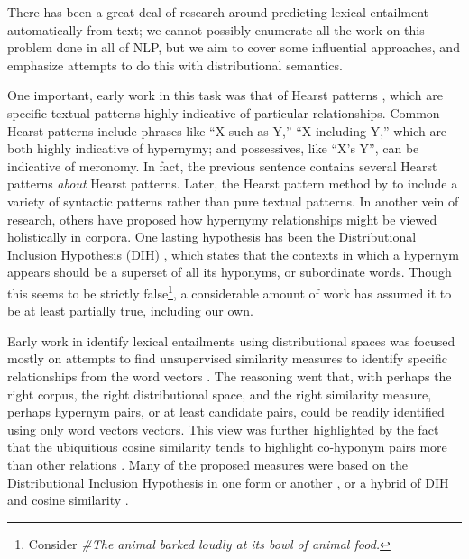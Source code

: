 \documentclass[letterpaper]{article}
\begin{document}
There has been a great deal of research around predicting lexical entailment
automatically from text; we cannot possibly enumerate all the work on this
problem done in all of NLP, but we aim to cover some influential approaches,
and emphasize attempts to do this with distributional semantics.

One important, early work in this task was that of Hearst patterns
\cite{hearst:1992:coling}, which are specific textual patterns highly
indicative of particular relationships. Common Hearst patterns include
phrases like ``X such as Y,'' ``X including Y,'' which are both highly
indicative of hypernymy; and possessives, like ``X's Y'', can be indicative
of meronomy. In fact, the previous sentence contains several Hearst patterns
{\em about} Hearst patterns. Later, the Hearst pattern method by
 to include a variety of syntactic patterns rather than
pure textual patterns. In another vein of research, others have proposed how
hypernymy relationships might be viewed holistically in corpora. One
lasting hypothesis has been the Distributional Inclusion Hypothesis (DIH)
\cite{zhitomirsky-geffet:2005:acl}, which states that the contexts in which a
hypernym appears should be a superset of all its hyponyms, or subordinate
words. Though this seems to be strictly false\footnote{Consider {\em \#The animal
barked loudly at its bowl of animal food.}}, a considerable amount of work has
assumed it to be at least partially true, including our own.

Early work in identify lexical entailments using distributional spaces was
focused mostly on attempts to find unsupervised similarity measures to identify
specific relationships from the word vectors
\cite{weeds:2004:coling,clarke:2009:gems,kotlerman:2010:nle,lenci:2012:starsem,santus:2013:thesis}.
The reasoning went that, with perhaps the right corpus, the right
distributional space, and the right similarity measure, perhaps hypernym pairs,
or at least candidate pairs, could be readily identified using only word
vectors vectors. This view was further highlighted by the fact that the
ubiquitious cosine similarity tends to highlight co-hyponym pairs more than
other relations \cite{baroni:2011:gems}. Many of the proposed measures were
based on the Distributional Inclusion Hypothesis in one form or another
\cite{clarke:2009:gems}, or a hybrid of DIH and cosine similarity
\cite{kotlerman:2010:nle,lenci:2012:starsem}.
\end{document}
